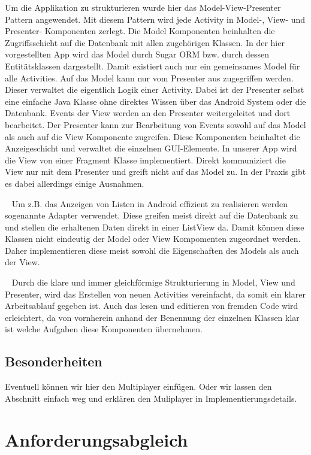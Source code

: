 \documentclass{scrartcl}
\begin{document}
Um die Applikation zu strukturieren wurde hier das Model-View-Presenter Pattern
angewendet. Mit diesem Pattern wird jede Activity in Model-, View- und Presenter-
Komponenten zerlegt. Die Model Komponenten beinhalten die Zugriffsschicht auf
die Datenbank mit allen zugehörigen Klassen. In der hier vorgestellten App wird
das Model durch Sugar ORM bzw. durch dessen Entitätsklassen dargestellt. Damit
existiert auch nur ein gemeinsames Model für alle Activities. Auf das Model
kann nur vom Presenter aus zugegriffen werden. Dieser verwaltet die
eigentlich Logik einer Activity. Dabei ist der Presenter selbst eine einfache
Java Klasse ohne direktes Wissen über das Android System oder die Datenbank.
Events der View werden an den Presenter weitergeleitet und dort bearbeitet. Der
Presenter kann zur Bearbeitung von Events sowohl auf das Model als auch auf die
View Komponente zugreifen. Diese Komponenten beinhaltet die Anzeigeschicht und
verwaltet die einzelnen GUI-Elemente. In unserer App wird die View von einer
Fragment Klasse implementiert. Direkt kommuniziert die View nur mit dem
Presenter und greift nicht auf das Model zu. In der Praxis gibt es dabei
allerdings einige Ausnahmen.

\ \newline
Um z.B. das Anzeigen von Listen in Android
effizient zu realisieren werden sogenannte Adapter verwendet. Diese greifen
meist direkt auf die Datenbank zu und stellen die erhaltenen Daten direkt in
einer ListView da. Damit können diese Klassen nicht eindeutig der Model oder
View Kompomenten zugeordnet werden. Daher implementieren diese meist sowohl die
Eigenschaften des Models als auch der View.

\ \newline
Durch die klare und immer gleichförmige Strukturierung in Model, View und
Presenter, wird das Erstellen von neuen Activities vereinfacht, da somit ein
klarer Arbeitsablauf gegeben ist. Auch das lesen und editieren von fremden Code
wird erleichtert, da von vornherein anhand der Benennung der einzelnen Klassen
klar ist welche Aufgaben diese Komponenten übernehmen.

\subsection{Besonderheiten}

Eventuell können wir hier den Multiplayer einfügen. Oder wir lassen den
Abschnitt einfach weg und erklären den Muliplayer in Implementierungsdetails.

\section{Anforderungsabgleich}
\end{document}
